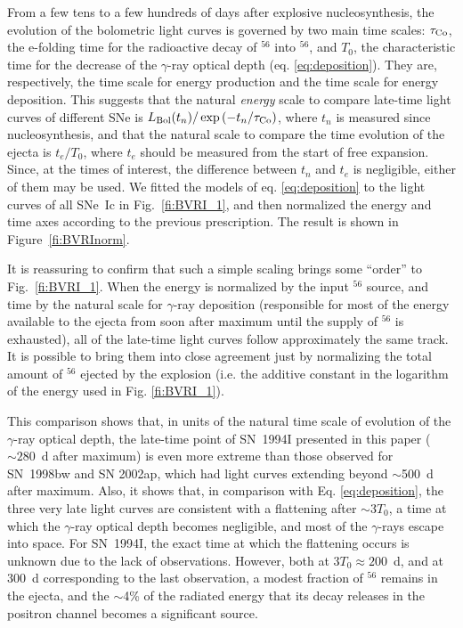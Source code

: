 \documentclass[12pt,manuscript]{aastex}
\begin{document}
From a few tens to a few hundreds of days after explosive 
nucleosynthesis, the evolution of the bolometric light 
curves is governed by two main time scales:
$\tau_{\rm Co}$, the e-folding time for the radioactive 
decay of $^{56}$ into $^{56}$, and
$T_0$, the characteristic time for the decrease of the 
$\gamma$-ray optical depth (eq. \ref{eq:deposition}).
%
They are, respectively, the time scale for energy production 
and the time scale for energy deposition.
%
This suggests that the natural {\em energy} scale to compare 
late-time light curves of different SNe is
$L_{\rm Bol}(t_n)/\exp{(-{t_n/\tau_{\rm Co}})}$, where $t_n$ 
is measured since nucleosynthesis,
and that the natural scale to compare the time evolution of 
the ejecta is $t_e/T_0$, where $t_e$ should
be measured from the start of free expansion.
%
Since, at the times of interest, the difference between 
$t_n$ and $t_e$ is negligible, either of them may be used.
%
We fitted the models of eq. \ref{eq:deposition} to the 
light curves of all SNe~Ic in Fig.~\ref{fi:BVRI_1}, and
then normalized the energy and time axes according to the 
previous prescription.
%
The result is shown in Figure~\ref{fi:BVRInorm}.


It is reassuring to confirm that such a simple scaling brings 
some ``order'' to Fig.~\ref{fi:BVRI_1}.
%
When the energy is normalized by the input $^{56}$ 
source, and time by the natural scale for $\gamma$-ray
deposition (responsible for most of the energy available to 
the ejecta from soon after maximum until the supply of 
$^{56}$ is exhausted), all of the late-time light 
curves follow approximately the same track.
%
It is possible to bring them into close agreement just 
by normalizing the total amount of  $^{56}$
ejected by the explosion (i.e. the additive constant
in the logarithm of the energy used in Fig. \ref{fi:BVRI_1}).


This comparison shows that, in units of the natural time scale
of evolution of the $\gamma$-ray optical depth, the late-time point of SN~1994I 
presented in this paper ($\sim 280$~d after maximum) is
even more extreme than those observed for SN~1998bw and SN 2002ap, 
which had light curves extending beyond $\sim$500~d after maximum.
%
Also, it shows that, in comparison with Eq. \ref{eq:deposition},
the three very late light curves are consistent 
with a flattening after $\sim 3 T_0$, a time at which the 
$\gamma$-ray optical depth becomes negligible, and most of 
the $\gamma$-rays escape into space.
%
For SN~1994I, the exact time at which the flattening occurs is 
unknown due to the lack of observations.
%
However, both at $3 T_0 \approx 200$~d, and at 300~d corresponding 
to the last observation, a modest fraction of $^{56}$ 
remains in the ejecta, and the $\sim$4\% of the radiated energy 
that its decay releases in the positron channel becomes a 
significant source.
\end{document}
